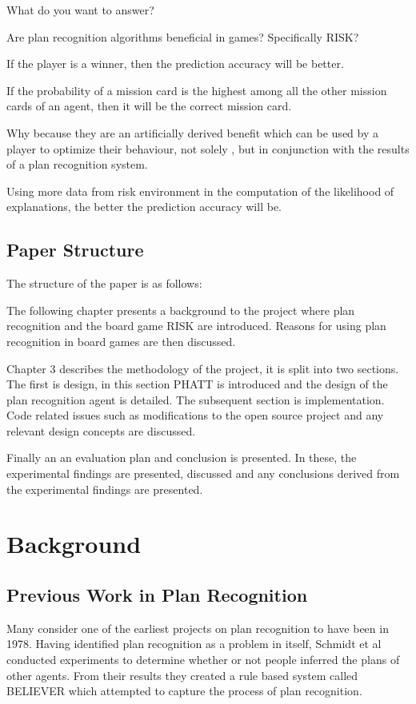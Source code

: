 \documentclass[parskip]{cs4rep}
\begin{document}
What do you want to answer?

Are plan recognition algorithms beneficial in games? Specifically RISK?

If the player is a winner, then the prediction accuracy will be better.

If the probability of a mission card is the highest among all the other mission cards of an agent, then it will be the correct mission card.

Why because they are an artificially derived benefit which can be used by a player to optimize their behaviour, not solely , but in conjunction with the results of a plan recognition system.

Using more data from risk environment in the computation of the likelihood of explanations, the better the prediction accuracy will be.

\section{Paper Structure}

The structure of the paper is as follows:

The following chapter presents a background to the project where plan recognition and the board game RISK are introduced. Reasons for using plan recognition in board games are then discussed.

Chapter 3 describes the methodology of the project, it is split into two sections. The first is design, in this section PHATT is introduced and the design of the plan recognition agent is detailed. The subsequent section is implementation. Code related issues such as modifications to the open source project and any relevant design concepts are discussed. 

Finally an an evaluation plan and conclusion is presented. In these, the experimental findings are presented, discussed and any conclusions derived from the experimental findings are presented.

\chapter{Background}

\section{Previous Work in Plan Recognition}

Many consider one of the earliest projects on plan recognition to have been in 1978. Having identified plan recognition as a problem in itself, Schmidt et al \cite{journals/ai/SchmidtSG78} conducted experiments to determine whether or not people inferred the plans of other agents. From their results they created a rule based system called BELIEVER which attempted to capture the process of plan recognition. 
\end{document}
